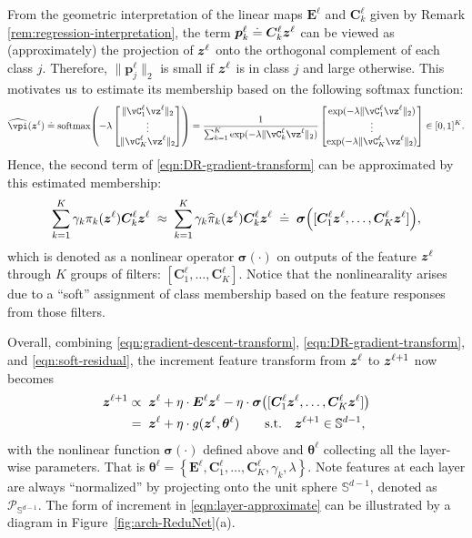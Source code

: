 \documentclass[\toplevelprefix/book-main.tex]{subfiles}
\begin{document}
From the geometric interpretation of the linear maps $\bm E^\ell$ and $\bm C_k^\ell$ given by Remark \ref{rem:regression-interpretation}, the term $\bm p_{k}^{\ell} \doteq \bm C^{\ell}_k \bm{z}^{\ell}$ can be viewed as (approximately) the projection of $\bm{z}^{\ell}$ onto the orthogonal complement of each class $j$. Therefore, $\|\bm p_{j}^{\ell}\|_2$ is small if $\bm{z}^\ell$ is in class $j$ and large otherwise. This motivates us to estimate its membership based on the following softmax function:
\begin{equation}
    \widehat{\vpi}(\z^\ell) \doteq \softmax\rp{-\lambda\mat{\norm{\vC^{\ell}_{1}\vz^{\ell}}_{2} \\ \vdots \\ \norm{\vC^{\ell}_{K}\vz^{\ell}}_{2}}} = \frac{1}{\sum_{k = 1}^{K}\exp(-\lambda \norm{\vC^{\ell}_{k}\vz^{\ell}}_{2})}\mat{\exp(-\lambda\norm{\vC^{\ell}_{1}\vz^{\ell}}_{2}) \\ \vdots \\ \exp(-\lambda\norm{\vC^{\ell}_{K}\vz^{\ell}}_{2})} \in [0,1]^{K}.
\end{equation}
Hence, the second term of \eqref{eqn:DR-gradient-transform} can be approximated by this estimated membership:
\begin{align}
\sum_{k=1}^K \gamma_{k} \pi_k(\bm{z}^\ell)\bm C_{k}^{\ell}  \bm{z}^{\ell} 
\; \approx \;  \sum_{k=1}^K \gamma_{k} \widehat{\pi}_k(\bm{z}^\ell)  \bm{C}^{\ell}_k  \bm{z}^{\ell} 
\; \doteq \; \bm \sigma\Big([\bm{C}^{\ell}_{1} \bm{z}^{\ell}, \dots, \bm{C}^{\ell}_{K} \bm{z}^{\ell}]\Big),
\label{eqn:soft-residual}
\end{align}
which is denoted as a nonlinear operator $\bm \sigma(\cdot)$ on outputs of the feature $\bm{z}^\ell$ through $K$ groups of filters: $[\bm{C}^{\ell}_{1}, \dots, \bm{C}^{\ell}_{K}]$. Notice that the nonlinearality arises due to a ``soft'' assignment of class membership based on the feature responses from those filters.  

Overall, combining \eqref{eqn:gradient-descent-transform},  \eqref{eqn:DR-gradient-transform}, and \eqref{eqn:soft-residual}, 
the increment feature transform from $\bm{z}^{\ell}$ to $\bm{z}^{\ell+1}$ now becomes
\begin{equation}\label{eqn:layer-approximate}
\begin{aligned}
\bm{z}^{\ell+1}  &\propto \; \bm{z}^\ell +  \eta \cdot  \bm E^{\ell} \bm{z}^{\ell} - \eta\cdot  \bm \sigma\big([\bm{C}^{\ell}_{1} \bm{z}^{\ell}, \dots, \bm{C}^{\ell}_{K} \bm{z}^{\ell}]\big)  \\
&= \; \bm{z}^\ell +  \eta \cdot g(\bm{z}^\ell, \bm \theta^\ell) \qquad \mbox{s.t.} \quad \bm{z}^{\ell +1} \in \mathbb{S}^{d-1},
\end{aligned}
\end{equation}
with the nonlinear function $\bm \sigma(\cdot)$ defined above and $\bm \theta^\ell$ collecting all the layer-wise parameters. That is  $\bm \theta^\ell =\left\{\bm E^\ell, \bm{C}^{\ell}_{1}, \dots, \bm{C}^{\ell}_{K}, \gamma_{k}, \lambda\right\}$. Note features at each layer are always ``normalized'' by projecting onto the unit sphere $\mathbb S^{d-1}$, denoted as $\mathcal P_{\mathbb S^{d-1}}$. The form of increment in \eqref{eqn:layer-approximate} can be illustrated by a diagram in  Figure~\ref{fig:arch-ReduNet}(a).
\end{document}
